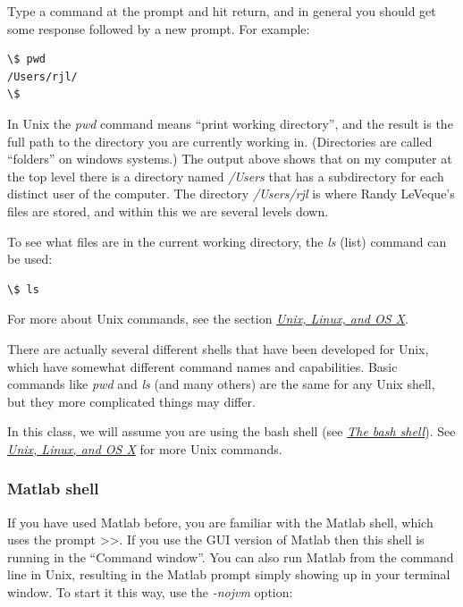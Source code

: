 \documentclass[letterpaper,10pt,english]{sphinxmanual}
\begin{document}
Type a command at the prompt and hit return, and in general you should get
some response followed by a new prompt.  For example:

\begin{Verbatim}[commandchars=\\\{\}]
\$ pwd
/Users/rjl/
\$
\end{Verbatim}

In Unix the \emph{pwd} command means ``print working directory'', and the result is
the full path to the directory you are currently working in.  (Directories
are called ``folders'' on windows systems.)  The output above shows that on my
computer at the top level there is a directory named \emph{/Users} that has a
subdirectory for each distinct user of the computer.  The directory
\emph{/Users/rjl} is where Randy LeVeque's files are stored, and within this we
are several levels down.

To see what files are in the current working directory, the \emph{ls} (list)
command can be used:

\begin{Verbatim}[commandchars=\\\{\}]
\$ ls
\end{Verbatim}

For more about Unix commands, see the section {\hyperref[unix:unix]{\emph{Unix, Linux, and OS X}}}.

There are actually several different shells that have been developed for
Unix, which have somewhat different command names and capabilities.  Basic
commands like \emph{pwd} and \emph{ls} (and many others) are the same for any Unix
shell, but they more complicated things may differ.

In this class, we will assume you are using the bash shell (see {\hyperref[unix:bash]{\emph{The bash shell}}}).
See {\hyperref[unix:unix]{\emph{Unix, Linux, and OS X}}} for more Unix commands.


\subsubsection{Matlab shell}
\label{shells:matlab-shell}
If you have used Matlab before, you are familiar with the Matlab shell,
which uses the prompt \textgreater{}\textgreater{}.  If you use the GUI version of Matlab then this
shell is running in the ``Command window''.  You can also run Matlab from the
command line in Unix, resulting in the Matlab prompt simply showing up in
your terminal window.  To start it this way, use the \emph{-nojvm} option:
\end{document}
